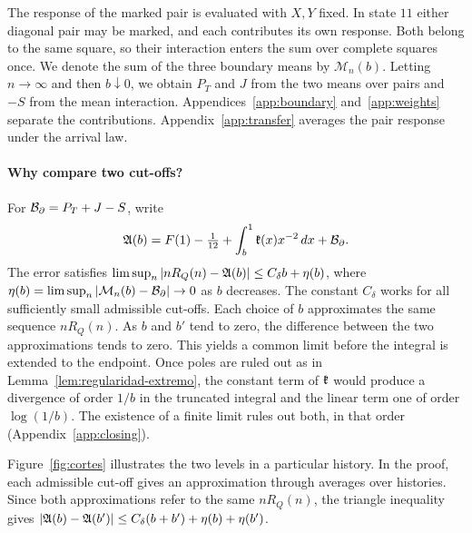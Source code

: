 The response of the marked pair is evaluated with \(X,Y\) fixed. In state \(11\) either diagonal pair may
be marked, and each contributes its own response. Both belong to the same square, so their interaction
enters the sum over complete squares once. We denote the sum of the three boundary means by \(\mathcal
M_n(b)\). Letting \(n\to\infty\) and then \(b\downarrow0\), we obtain \(P_T\) and \(J\) from the two means
over pairs and \(-S\) from the mean interaction. Appendices~\ref{app:boundary} and~\ref{app:weights}
separate the contributions. Appendix~\ref{app:transfer} averages the pair response under the arrival law.

\paragraph{Why compare two cut-offs?} For \(\mathcal B_{\partial}=P_T+J-S\), write
\[
 \mathfrak A(b)=F(1)-\tfrac1{12}+\int_b^1 \mathfrak{k}(x)x^{-2}\,dx+\mathcal B_{\partial}.
\]
The error satisfies \(\limsup_n |nR_Q(n)-\mathfrak A(b)|\le C_\delta b+\eta(b)\), where
\(\eta(b)=\limsup_n|\mathcal M_n(b)-\mathcal B_{\partial}|\to0\) as \(b\) decreases. The constant \(C_\delta\)
works for all sufficiently small admissible cut-offs. Each choice of \(b\) approximates the same sequence
\(nR_Q(n)\). As \(b\) and \(b'\) tend to zero, the difference between the two approximations tends to
zero. This yields a common limit before the integral is extended to the endpoint. Once poles are ruled out
as in Lemma~\ref{lem:regularidad-extremo}, the constant term of \(\mathfrak{k}\) would produce a divergence of
order \(1/b\) in the truncated integral and the linear term one of order \(\log(1/b)\). The existence of
a finite limit rules out both, in that order (Appendix~\ref{app:closing}).

Figure~\ref{fig:cortes} illustrates the two levels in a particular history. In the proof, each admissible
cut-off gives an approximation through averages over histories. Since both approximations refer to the
same \(nR_Q(n)\), the triangle inequality gives \(\lvert\mathfrak A(b)-\mathfrak A(b')\rvert\le
C_\delta(b+b')+\eta(b)+\eta(b')\).


